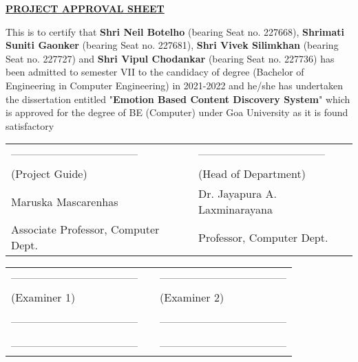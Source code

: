 \begin{center}
%
\underline{\bfseries \huge PROJECT APPROVAL SHEET}\\
\vspace{1cm}
\end{center}
\noindent This is to certify that \textbf{Shri Neil Botelho} (bearing Seat no. 227668), \textbf{Shrimati Suniti Gaonker} (bearing Seat no. 227681), \textbf{Shri Vivek Silimkhan} (bearing Seat no. 227727) and \textbf{Shri Vipul Chodankar} (bearing Seat no. 227736) has been admitted to semester VII to the candidacy of degree (Bachelor of Engineering in Computer Engineering) in 2021-2022 and he/she has undertaken the dissertation entitled "\textbf{Emotion Based Content Discovery System}" which is approved for the degree of BE (Computer) under Goa University as it is found satisfactory

\vspace{2.8cm}

\begin{table}[H]
	\begin{center}
\begin{tabular}{lcl}
	\noindent ----------------------------------- &\hspace{1cm}&  ----------------------------------- \\
(Project Guide) & \hspace{3cm} & (Head of Department) \\
Maruska Mascarenhas & \hspace{3cm} & Dr. Jayapura A. Laxminarayana  \\
Associate Professor, Computer Dept. & \hspace{3cm} & Professor, Computer Dept. \\
\end{tabular}
\end{center}
\end{table}

\vspace{2.5cm}

\begin{table}[H]
	\begin{center}
\begin{tabular}{lcl}
	\noindent ----------------------------------- &\hspace{5cm}&  ----------------------------------- \\
(Examiner 1) & \hspace{5cm} & (Examiner 2) \\
\\
\noindent ----------------------------------- &\hspace{5cm} &\noindent ----------------------------------- \\
\\
\noindent ----------------------------------- &\hspace{5cm} &\noindent ----------------------------------- \\

\end{tabular}
\end{center}
\end{table}

